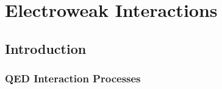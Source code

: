 
\chapter{Electroweak Interactions}%
\label{cha:electroweak_interactions}

\section{Introduction}%
\label{sec:ew-introduction}

\subsection{QED Interaction Processes}%
\label{sub:qed_interaction_processes}


